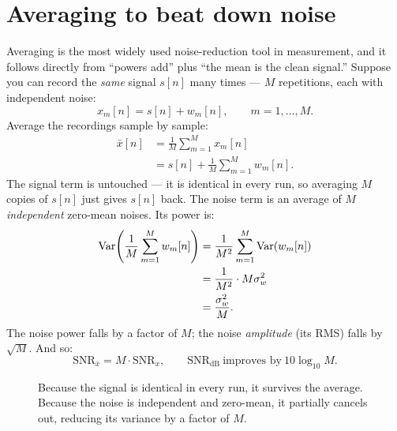 \section{Averaging to beat down noise}
\label{ch20:averaging}

Averaging is the most widely used noise-reduction tool in measurement, and it follows
directly from ``powers add'' plus ``the mean is the clean signal.'' Suppose you
can record the \emph{same} signal $s[n]$ many times --- $M$ repetitions, each with
independent noise:
\[
  x_m[n] = s[n] + w_m[n], \qquad m = 1,\dots,M.
\]
Average the recordings sample by sample:
\begin{align*}
  \bar x[n] &= \frac{1}{M}\sum_{m=1}^{M} x_m[n] \\
            &= s[n] + \frac{1}{M}\sum_{m=1}^{M} w_m[n].
\end{align*}
The signal term is untouched --- it is identical in every run, so averaging
$M$ copies of $s[n]$ just gives $s[n]$ back. The noise term is an average of $M$
\emph{independent} zero-mean noises. Its power is:
\begin{align*}
  \operatorname{Var}\!\left(\frac{1}{M}\sum_{m=1}^M w_m[n]\right)
  &= \frac{1}{M^2}\sum_{m=1}^M \operatorname{Var}(w_m[n]) \\
  &= \frac{1}{M^2}\cdot M\sigma_w^2 \\
  &= \frac{\sigma_w^2}{M}.
\end{align*}
The noise power falls by a factor of $M$; the noise \emph{amplitude} (its RMS)
falls by $\sqrt{M}$. And so:
\begin{equation}
  \mathrm{SNR}_{\bar x} = M\cdot \mathrm{SNR}_x,
  \qquad
  \mathrm{SNR_{dB}}\ \text{improves by}\ 10\log_{10} M.
  \label{ch20:avg-gain}
\end{equation}

\begin{figure}[H]
\centering
{}
\caption{Because the signal is identical in every run, it survives the average. Because the noise is independent and zero-mean, it partially cancels out, reducing its variance by a factor of $M$.}
\label{ch20:fig-ensemble-average}
\end{figure}

